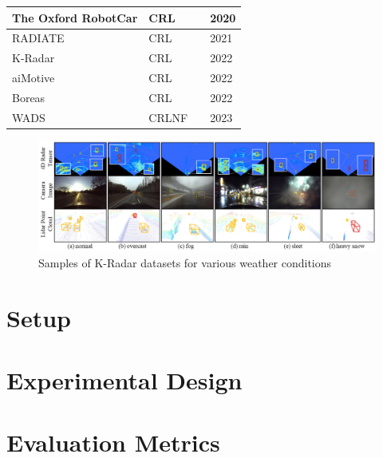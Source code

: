 \documentclass[report.tex]{subfiles}
\begin{document}
\begin{itemize}
\begin{table}[h]
\begin{tabular}{|l|l|l|l|}
                    The Oxford RobotCar & CRL              & \cite{barnes2020oxford}     & 2020          \\ \hline
                    RADIATE             & CRL              & \cite{sheeny2021radiate}    & 2021          \\ \hline
                    K-Radar             & CRL              & \cite{Paek2022Jun}          & 2022          \\ \hline
                    aiMotive            & CRL              & \cite{matuszka2022aimotive} & 2022          \\ \hline
                    Boreas              & CRL              & \cite{burnett2022boreas}    & 2022          \\ \hline
                    WADS                & CRLNF            & \cite{kurup2022winter}      & 2023          \\ \hline
                \end{tabular}
            \end{table}

            \begin{figure}[h]
                \centering
                \includegraphics[width=1.0\textwidth]{images/all_sensors_in_adverse_weather.png}
                \caption{\centering Samples of K-Radar datasets for various weather conditions \cite{Paek2022Jun}}
                \label{fig:all_sensors_in_adverse_weather}
            \end{figure}
        \end{itemize}

    \section{Setup}

    \section{Experimental Design}

    \section{Evaluation Metrics}

    
\end{document}
